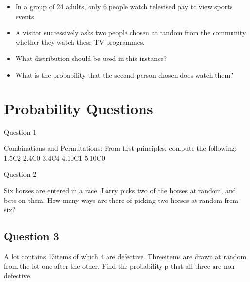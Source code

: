 %
%
%
%
%
%
%
%


\begin{itemize}

\item In a group of 24 adults, only 6 people watch televised pay to view
sports events. 
\item A visitor successively asks two people chosen at random from the
community whether they watch these TV programmes.

\item What distribution should be used in this instance? 
\item What is the probability
that the second person chosen does watch them?
\end{itemize}


\section{Probability Questions}

Question 1 

Combinations and Permutations: From first principles, compute the following:
1.5C2
2.4C0
3.4C4
4.10C1
5.10C0




Question 2

Six horses are entered in a race. Larry picks two of the horses at random, and bets on them. 
How many ways are there of picking two horses at random from six?






\subsection{Question 3}
A lot contains 13items of which 4 are defective. Threeitems are drawn at random from the lot one after the other. Find the probability p that all three are non-defective.




